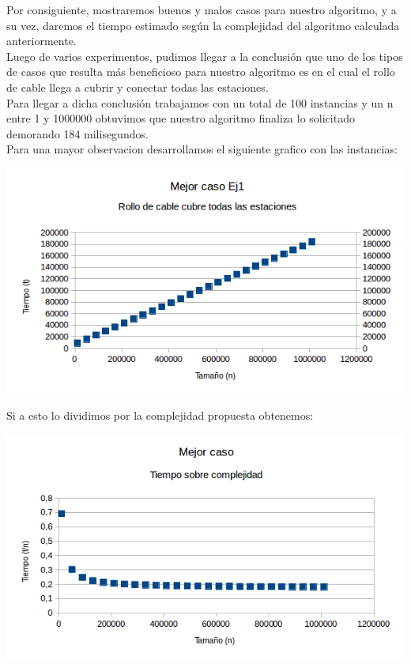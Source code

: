 \indent Por consiguiente, mostraremos buenos y malos casos para nuestro algoritmo, y a su vez, daremos el tiempo estimado 
seg\'un la complejidad del algoritmo calculada anteriormente.\\

Luego de varios experimentos, pudimos llegar a la conclusi\'on que uno de los tipos de casos que resulta m\'as beneficioso para nuestro algoritmo
es en el cual el rollo de cable llega a cubrir y conectar todas las estaciones.\\

Para llegar a dicha conclusi\'on trabajamos con un total de 100 instancias y un n entre 1 y 1000000 obtuvimos que nuestro
algoritmo finaliza lo solicitado demorando 184 milisegundos.\\

Para una mayor observacion desarrollamos el siguiente grafico con las instancias:\\

\vspace*{0.3cm} \vspace*{0.3cm}
  \begin{center}
 \includegraphics[scale=0.8]{./EJ1/mejorcasoej1.png}
  \end{center}
  \vspace*{0.3cm}


Si a esto lo dividimos por la complejidad propuesta obtenemos:\\

\vspace*{0.3cm} \vspace*{0.3cm}
  \begin{center}
 \includegraphics[scale=0.8]{./EJ1/mejorcasoej11.png}
  \end{center}
  \vspace*{0.3cm}

